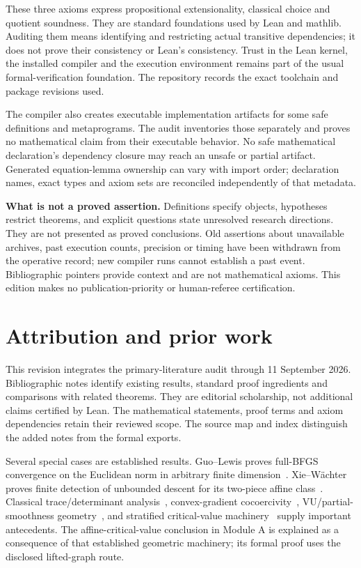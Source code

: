 \documentclass[10pt,oneside,openany]{book}
\theoremstyle{remark}\newtheorem{remark}{Remark}[chapter]
\begin{document}
These three axioms express propositional extensionality, classical choice and quotient soundness. They are standard foundations used by Lean and mathlib. Auditing them means identifying and restricting actual transitive dependencies; it does not prove their consistency or Lean's consistency. Trust in the Lean kernel, the installed compiler and the execution environment remains part of the usual formal-verification foundation. The repository records the exact toolchain and package revisions used.

The compiler also creates executable implementation artifacts for some safe definitions and metaprograms. The audit inventories those separately and proves no mathematical claim from their executable behavior. No safe mathematical declaration's dependency closure may reach an unsafe or partial artifact. Generated equation-lemma ownership can vary with import order; declaration names, exact types and axiom sets are reconciled independently of that metadata.

\textbf{What is not a proved assertion.} Definitions specify objects, hypotheses restrict theorems, and explicit questions state unresolved research directions. They are not presented as proved conclusions. Old assertions about unavailable archives, past execution counts, precision or timing have been withdrawn from the operative record; new compiler runs cannot establish a past event. Bibliographic pointers provide context and are not mathematical axioms. This edition makes no publication-priority or human-referee certification.

\chapter*{Attribution and prior work}
This revision integrates the primary-literature audit through 11 September 2026. Bibliographic notes identify existing results, standard proof ingredients and comparisons with related theorems. They are editorial scholarship, not additional claims certified by Lean. The mathematical statements, proof terms and axiom dependencies retain their reviewed scope. The source map and index distinguish the added notes from the formal exports.

Several special cases are established results. Guo--Lewis proves full-BFGS convergence on the Euclidean norm in arbitrary finite dimension~\cite[Corollary 4.2]{GL18}. Xie--W\"achter proves finite detection of unbounded descent for its two-piece affine class~\cite[Theorem IV.1]{XW}. Classical trace/determinant analysis~\cite{FND_N92,FND_BN89,FND_P76}, convex-gradient cocoercivity~\cite{WW}, VU/partial-smoothness geometry~\cite{geom_Lewis2002,LL}, and stratified critical-value machinery~\cite{BDLS} supply important antecedents. The affine-critical-value conclusion in Module A is explained as a consequence of that established geometric machinery; its formal proof uses the disclosed lifted-graph route.
\end{document}
